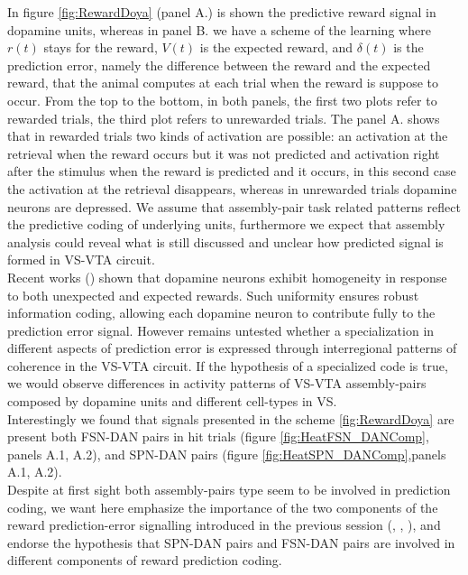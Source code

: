 In figure \ref{fig:RewardDoya} (panel A.) is shown the predictive reward signal in dopamine units, whereas in panel B. we have a scheme of the learning where $r(t)$ stays for the reward, $V(t)$ is the expected reward, and $\delta(t)$ is the prediction error, namely the difference between the reward and the expected reward, that the animal computes at each trial when the reward is suppose to occur. From the top to the bottom, in both panels, the first two plots refer to rewarded trials, the third plot refers to unrewarded trials. The panel A. shows that in rewarded trials two kinds of activation are possible: an activation at the retrieval when the reward occurs but it was not predicted and activation right after the stimulus when the reward is predicted and it occurs, in this second case the activation at the retrieval disappears, whereas in unrewarded trials dopamine neurons are depressed. We assume that assembly-pair task related patterns reflect the predictive coding of underlying units, furthermore we expect that assembly analysis could reveal what is still discussed and unclear how predicted signal is formed in VS-VTA circuit.\\Recent works (\cite{UchidaDop}) shown that dopamine neurons exhibit homogeneity in response to both unexpected and expected rewards. Such uniformity ensures robust information coding, allowing each dopamine neuron to contribute fully to the prediction error signal. However remains untested whether a specialization in different aspects of prediction error is expressed through interregional patterns of coherence in the VS-VTA circuit. If the hypothesis of a specialized code is true, we would observe differences in activity patterns of VS-VTA assembly-pairs composed by dopamine units and different cell-types in VS.\\Interestingly we found that signals presented in the scheme \ref{fig:RewardDoya} are present both FSN-DAN pairs in hit trials (figure \ref{fig:HeatFSN_DANComp}, panels A.1, A.2), and SPN-DAN pairs (figure \ref{fig:HeatSPN_DANComp},panels A.1, A.2).\\Despite at first sight both assembly-pairs type seem to be involved in prediction coding, we want here emphasize the importance of the two components of the reward prediction-error signalling introduced in the previous session (\cite{Tobler2003}, \cite{Nomoto2010}, \cite{Fiorillo2013} \cite{Schultz2016}), and endorse the hypothesis that SPN-DAN pairs and FSN-DAN pairs are involved in different components of reward prediction coding.\\
